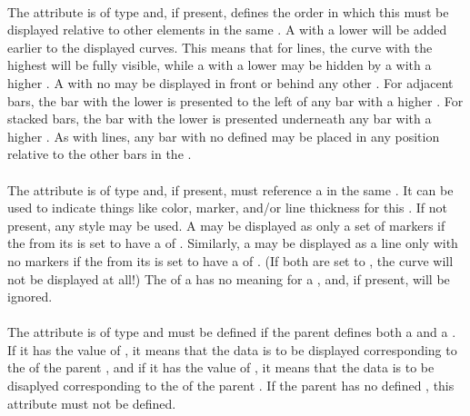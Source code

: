 \begin{blockChanged}
\paragraph*{}
The  attribute is of type  and, if present, defines the order in which this \Curve must be displayed relative to other \Curve elements in the same \Plot.  A \Curve with a lower  will be added earlier to the displayed curves.  This means that for lines, the curve with the highest  will be fully visible, while a \Curve with a lower  may be hidden by a \Curve with a higher .  A \Curve with no  may be displayed in front or behind any other \Curve.  For adjacent bars, the bar with the lower  is presented to the left of any bar with a higher .  For stacked bars, the bar with the lower  is presented underneath any bar with a higher .  As with lines, any bar with no  defined may be placed in any position relative to the other bars in the \Curve.

\paragraph*{}
The  attribute is of type \SIdRef and, if present, must reference a \Style in the same \SedDocument.  It can be used to indicate things like color, marker, and/or line thickness for this \Curve.  If not present, any style may be used.  A \Curve may be displayed as only a set of markers if the \Line from its \Style is set to have a  of .  Similarly, a \Curve may be displayed as a line only with no markers if the \Marker from its \Style is set to have a  of .  (If both are set to , the curve will not be displayed at all!)  The \Fill of a \Style has no meaning for a \Curve, and, if present, will be ignored.

\paragraph*{}
The  attribute is of type  and must be defined if the parent \Plot defines both a  and a .  If it has the value of , it means that the data is to be displayed corresponding to the  of the parent \Plot, and if it has the value of , it means that the data is to be disaplyed corresponding to the  of the parent \Plot.  If the parent \Plot has no defined , this attribute must not be defined.


\end{blockChanged}
